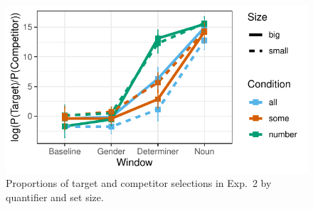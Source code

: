 \documentclass[10pt,letterpaper]{article}
\begin{document}

\begin{figure}[H]
\centering
\includegraphics[width=\columnwidth]{../../analysis/SunBreheny/main/graphs/results-idt}
\caption{Proportions of target and competitor selections in Exp.~2 by quantifier and set size.} 
\label{fig:results-idt}
\end{figure}
\end{document}

